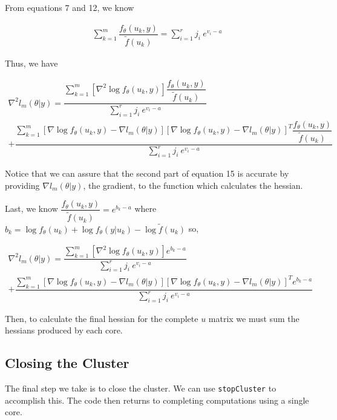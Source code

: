 \documentclass{article}
\begin{document}
\noindent From equations 7 and 12, we know

\begin{align}
\sum_{k=1}^m  \dfrac{ f_\theta(u_k,y)   }{\tilde{f}(u_k)} = \sum\limits_{i=1}^r j_i \ e^{v_i - a}
\end{align}

\noindent Thus, we have

\begin{multline}
\nabla^2 l_m(\theta|y)= \dfrac{   \sum_{k=1}^m \left[ \nabla^2 \log f_\theta(u_k,y)     \right]  \dfrac{ f_\theta(u_k,y)}{\tilde{f}(u_k)}  }{\sum\limits_{i=1}^r j_i \ e^{v_i - a}}\\
+ \dfrac{   \sum_{k=1}^m \left[ \nabla \log f_\theta(u_k,y)  - \nabla l_m(\theta|y)   \right] \left[ \nabla \log f_\theta(u_k,y)  -\nabla l_m(\theta|y)  \right]^T  \dfrac{ f_\theta(u_k,y)   }{\tilde{f}(u_k)}   }{\sum\limits_{i=1}^r j_i \ e^{v_i - a}}
\end{multline}

\noindent Notice that we can assure that the second part of equation 15 is accurate by providing $\nabla l_m (\theta|y)$, the gradient, to the function which calculates the hessian.

Last, we know $\dfrac{f_\theta(u_k, y)}{\tilde{f}(u_k)} = e^{b_k -a}$ where $b_k = \log f_\theta (u_k) + \log f_\theta (y|u_k) - \log  \tilde{f} (u_k)$ so, 

\begin{multline}
\nabla^2 l_m(\theta|y)= \dfrac{   \sum_{k=1}^m \left[ \nabla^2 \log f_\theta(u_k,y)     \right]  e^{b_k-a}  }{\sum\limits_{i=1}^r j_i \ e^{v_i - a}}\\
+ \dfrac{   \sum_{k=1}^m \left[ \nabla \log f_\theta(u_k,y)  - \nabla l_m(\theta|y)   \right] \left[ \nabla \log f_\theta(u_k,y)  -\nabla l_m(\theta|y)  \right]^T  e^{b_k-a}}{\sum\limits_{i=1}^r j_i \ e^{v_i - a}}
\end{multline}

Then, to calculate the final hessian for the complete $u$ matrix we must sum the hessians produced by each core. 

\subsection{Closing the Cluster}
The final step we take is to close the cluster. We can use \texttt{stopCluster} to accomplish this. The code then returns to completing computations using a single core. 
\end{document}

